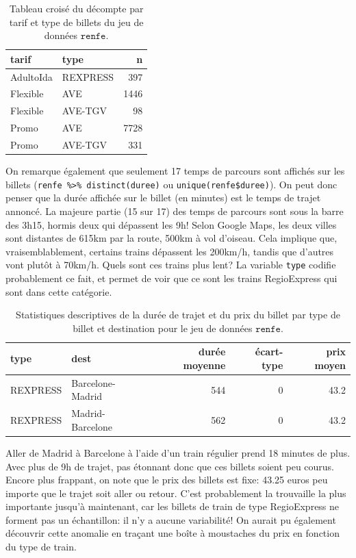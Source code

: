 \documentclass[
  11pt,
  letterpaper,
]{article}
\theoremstyle{definition}
\theoremstyle{definition}
\theoremstyle{definition}
\theoremstyle{definition}
\theoremstyle{remark}
\begin{document}
\begin{table}

\caption{\label{tab:renfe-aed2}Tableau croisé du décompte par tarif et type de billets du jeu de données $\texttt{renfe}$.}
\centering
\begin{tabular}[t]{llr}
\toprule
tarif & type & n\\
\midrule
AdultoIda & REXPRESS & 397\\
Flexible & AVE & 1446\\
Flexible & AVE-TGV & 98\\
Promo & AVE & 7728\\
Promo & AVE-TGV & 331\\
\bottomrule
\end{tabular}
\end{table}

On remarque également que seulement 17 temps de parcours sont affichés sur les billets (\texttt{renfe\ \%\textgreater{}\%\ distinct(duree)} ou \texttt{unique(renfe\$duree)}). On peut donc penser que la durée affichée sur le billet (en minutes) est le temps de trajet annoncé. La majeure partie (15 sur 17) des temps de parcours sont sous la barre des 3h15, hormis deux qui dépassent les 9h! Selon Google Maps, les deux villes sont distantes de 615km par la route, 500km à vol d'oiseau. Cela implique que, vraisemblablement, certains trains dépassent les 200km/h, tandis que d'autres vont plutôt à 70km/h. Quels sont ces trains plus lent? La variable \texttt{type} codifie probablement ce fait, et permet de voir que ce sont les trains RegioExpress qui sont dans cette catégorie.

\begin{table}

\caption{\label{tab:renfe-aed3}Statistiques descriptives de la durée de trajet et du prix du billet par type de billet et destination pour le jeu de données $\texttt{renfe}$.}
\centering
\begin{tabular}[t]{llrrr}
\toprule
type & dest & durée moyenne & écart-type & prix moyen\\
\midrule
REXPRESS & Barcelone-Madrid & 544 & 0 & 43.2\\
REXPRESS & Madrid-Barcelone & 562 & 0 & 43.2\\
\bottomrule
\end{tabular}
\end{table}

Aller de Madrid à Barcelone à l'aide d'un train régulier prend 18 minutes de plus. Avec plus de 9h de trajet, pas étonnant donc que ces billets soient peu courus. Encore plus frappant, on note que le prix des billets est fixe: 43.25 euros peu importe que le trajet soit aller ou retour. C'est probablement la trouvaille la plus importante jusqu'à maintenant, car les billets de train de type RegioExpress ne forment pas un échantillon: il n'y a aucune variabilité! On aurait pu également découvrir cette anomalie en traçant une boîte à moustaches du prix en fonction du type de train.
\end{document}
